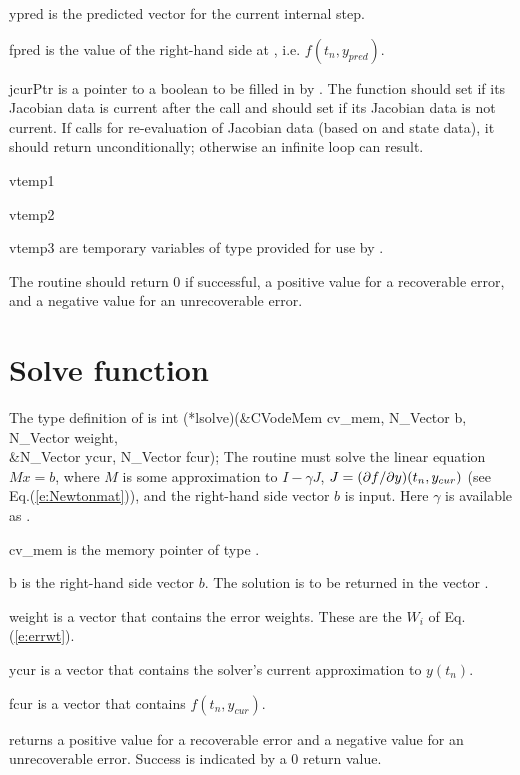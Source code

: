 {\begin{args}[convfail]
   \item[ypred]
     is the predicted  vector for the current {\cvode} internal step.
  
   \item[fpred]
     is the value of the right-hand side at , i.e. $f(t_n, y_{pred})$.
  
   \item[jcurPtr]
     is a pointer to a boolean to be filled in by .  
     The function should set  if its Jacobian 
     data is current after the call and should set         
      if its Jacobian data is not current.   
     If  calls for re-evaluation of         
     Jacobian data (based on  and {\cvode} state      
     data), it should return  unconditionally;
     otherwise an infinite loop can result.                
    
   \item[vtemp1] 
   \item[vtemp2]
   \item[vtemp3] 
     are temporary variables of type  provided for use by .
   \end{args}
}
{
  The  routine should return $0$ if successful,            
  a positive value for a recoverable error, and a negative value  
  for an unrecoverable error.  
}
{}


\section{Solve function}
The type definition of  is
{
  int (*lsolve)(&CVodeMem cv\_mem, N\_Vector b, N\_Vector weight, \\
                &N\_Vector ycur, N\_Vector fcur);  
}
{
  The routine  must solve the linear equation $M x = b$, where         
  $M$ is some approximation to $I - \gamma J$, $J = (\partial f / \partial y)(t_n, y_{cur})$
  (see Eq.(\ref{e:Newtonmat})), and the right-hand side vector $b$ is input.
  Here $\gamma$ is available as .
}
{
  \begin{args}[cv\_mem]
  \item[cv\_mem]
    is the {\cvode} memory pointer of type .
  \item[b]
    is the right-hand side vector $b$. The solution is to be    
    returned in the vector .
  \item[weight]
    is a vector that contains the error weights.
    These are the $W_i$ of Eq.(\ref{e:errwt}).
  \item[ycur]
    is a vector that contains the solver's current approximation to $y(t_n)$.
  \item[fcur]
    is a vector that contains $f(t_n,y_{cur})$. 
  \end{args}
}
{
   returns a positive value    
  for a recoverable error and a negative value for an             
  unrecoverable error. Success is indicated by a $0$ return value.
}
{}


